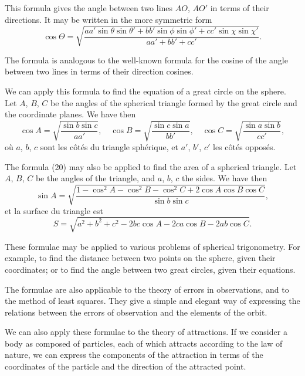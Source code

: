 \documentclass[11pt,a4paper]{article}
\begin{document}
\newpage
\setcounter{page}{220}

This formula gives the angle between two lines $AO$, $AO'$ in terms of their
directions. It may be written in the more symmetric form
\[
\cos\Theta = \sqrt{\frac{aa'\sin\theta \sin\theta' + bb'\sin\phi \sin\phi' + cc'\sin\chi \sin\chi'}{aa' + bb' + cc'}}.
\]

The formula is analogous to the well-known formula for the cosine of the angle
between two lines in terms of their direction cosines.

\newpage
\setcounter{page}{221}

We can apply this formula to find the equation of a great circle on the sphere.
Let $A$, $B$, $C$ be the angles of the spherical triangle formed by the great circle and
the coordinate planes. We have then
\[
\cos A = \sqrt{\frac{\sin b \sin c}{aa'}}, \quad \cos B = \sqrt{\frac{\sin c \sin a}{bb'}}, \quad \cos C = \sqrt{\frac{\sin a \sin b}{cc'}},
\]
o\`{u} $a$, $b$, $c$ sont les c\^{o}t\'{e}s du triangle sph\'{e}rique, et $a'$, $b'$, $c'$ les c\^{o}t\'{e}s oppos\'{e}s.

\newpage
\setcounter{page}{222}

The formula (20) may also be applied to find the area of a spherical triangle.
Let $A$, $B$, $C$ be the angles of the triangle, and $a$, $b$, $c$ the sides. We have then
\[
\sin A = \sqrt{\frac{1 - \cos^2 A - \cos^2 B - \cos^2 C + 2\cos A \cos B \cos C}{\sin b \sin c}},
\]
et la surface du triangle est
\[
S = \sqrt{a^2 + b^2 + c^2 - 2bc\cos A - 2ca\cos B - 2ab\cos C}.
\]

\newpage
\setcounter{page}{223}

These formulae may be applied to various problems of spherical trigonometry.
For example, to find the distance between two points on the sphere, given their
coordinates; or to find the angle between two great circles, given their equations.

The formulae are also applicable to the theory of errors in observations, and to
the method of least squares. They give a simple and elegant way of expressing the
relations between the errors of observation and the elements of the orbit.

\newpage
\setcounter{page}{224}

We can also apply these formulae to the theory of attractions. If we consider a
body as composed of particles, each of which attracts according to the law of nature,
we can express the components of the attraction in terms of the coordinates of the
particle and the direction of the attracted point.
\end{document}
